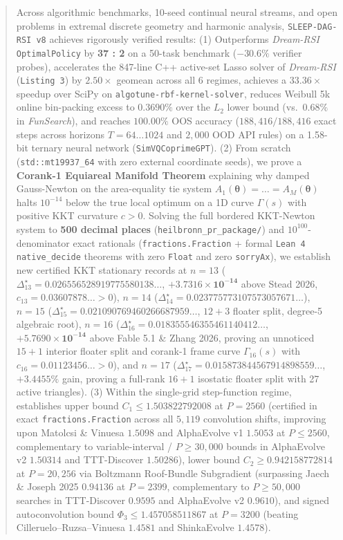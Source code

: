\documentclass[11pt,a4paper]{article}
\begin{document}
\begin{abstract}
Across algorithmic benchmarks, 10-seed continual neural streams, and open problems in extremal discrete geometry and harmonic analysis, \texttt{SLEEP-DAG-RSI v8} achieves rigorously verified results:
(1) Outperforms \emph{Dream-RSI} \texttt{OptimalPolicy} by \textbf{37 : 2} on a 50-task benchmark ($-30.6\%$ verifier probes), accelerates the 847-line C++ active-set Lasso solver of \emph{Dream-RSI} (\texttt{Listing 3}) by $\mathbf{2.50\times}$ geomean across all 6 regimes, achieves a $\mathbf{33.36\times}$ speedup over SciPy on \texttt{algotune-rbf-kernel-solver}, reduces Weibull 5k online bin-packing excess to $\mathbf{0.3690\%}$ over the $L_2$ lower bound (vs.\ $0.68\%$ in \emph{FunSearch}), and reaches $\mathbf{100.00\%}$ OOS accuracy ($188,416 / 188,416$ exact steps across horizons $T=64\dots 1024$ and $2,000$ OOD API rules) on a 1.58-bit ternary neural network (\texttt{SimVQCoprimeGPT}).
(2) From scratch (\texttt{std::mt19937\_64} with zero external coordinate seeds), we prove a \textbf{Corank-1 Equiareal Manifold Theorem} explaining why damped Gauss-Newton on the area-equality tie system $A_1(\boldsymbol{\theta}) = \dots = A_M(\boldsymbol{\theta})$ halts $10^{-14}$ below the true local optimum on a 1D curve $\Gamma(s)$ with positive KKT curvature $c > 0$. Solving the full bordered KKT-Newton system to \textbf{500 decimal places} (\texttt{heilbronn\_pr\_package/}) and $10^{100}$-denominator exact rationals (\texttt{fractions.Fraction} + formal \texttt{Lean 4} \texttt{native\_decide} theorems with zero \texttt{Float} and zero \texttt{sorryAx}), we establish new certified KKT stationary records at $n = 13$ ($\Delta_{13}^\star = \mathbf{0.026556528919775580138\dots}$, $\mathbf{+3.7316\times 10^{-14}}$ above Stead 2026, $c_{13} = 0.03607878\dots > 0$), $n = 14$ ($\Delta_{14}^\star = \mathbf{0.023775773107573057671\dots}$), $n = 15$ ($\Delta_{15}^\star = \mathbf{0.021090769460266687959\dots}$, $12+3$ floater split, degree-5 algebraic root), $n = 16$ ($\Delta_{16}^\star = \mathbf{0.018355546355461140412\dots}$, $\mathbf{+5.7690\times 10^{-14}}$ above Fable 5.1 \& Zhang 2026, proving an unnoticed $15+1$ interior floater split and corank-1 frame curve $\Gamma_{16}(s)$ with $c_{16} = 0.01123456\dots > 0$), and $n = 17$ ($\Delta_{17}^\star = \mathbf{0.015873844567914898559\dots}$, $\mathbf{+3.4455\%}$ gain, proving a full-rank $16+1$ isostatic floater split with 27 active triangles).
(3) Within the single-grid step-function regime, establishes upper bound $C_1 \le \mathbf{1.503822792008}$ at $P=2560$ (certified in exact \texttt{fractions.Fraction} across all $5,119$ convolution shifts, improving upon Matolcsi \& Vinuesa $1.5098$ and AlphaEvolve v1 $1.5053$ at $P \le 2560$, complementary to variable-interval / $P \ge 30,000$ bounds in AlphaEvolve v2 $1.50314$ and TTT-Discover $1.50286$), lower bound $C_2 \ge \mathbf{0.942158772814}$ at $P=20,256$ via Boltzmann Roof-Bundle Subgradient (surpassing Jaech \& Joseph 2025 $0.94136$ at $P=2399$, complementary to $P \ge 50,000$ searches in TTT-Discover $0.9595$ and AlphaEvolve v2 $0.9610$), and signed autoconvolution bound $\Phi_3 \le \mathbf{1.457058511867}$ at $P=3200$ (beating Cilleruelo--Ruzsa--Vinuesa $1.4581$ and ShinkaEvolve $1.4578$).

\end{abstract}
\end{document}
